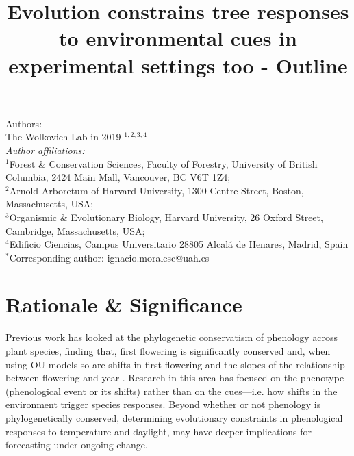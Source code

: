\documentclass{article}\usepackage[]{graphicx}\usepackage[]{color}
\title{Evolution constrains tree responses to environmental cues in experimental settings too - Outline}
\begin{document}
\maketitle

\noindent Authors:\\
The Wolkovich Lab in 2019 $^{1,2,3,4}$
\vspace{2ex}\\
\emph{Author affiliations:}\\
$^{1}$Forest \& Conservation Sciences, Faculty of Forestry, University of British Columbia, 2424 Main Mall, Vancouver, BC V6T 1Z4;\\
$^{2}$Arnold Arboretum of Harvard University, 1300 Centre Street, Boston, Massachusetts, USA;\\
$^{3}$Organismic \& Evolutionary Biology, Harvard University, 26 Oxford Street, Cambridge, Massachusetts, USA;\\
$^{4}$Edificio Ciencias, Campus Universitario 28805 Alcalá de Henares, Madrid, Spain\\
 

\vspace{2ex}
$^*$Corresponding author: ignacio.moralesc@uah.es\\
\renewcommand{\thetable}{\arabic{table}}
\renewcommand{\thefigure}{\arabic{figure}}
\renewcommand{\labelitemi}{$-$}

\clearpage
\section*{Rationale \& Significance}

Previous work has looked at the phylogenetic conservatism of phenology across plant species, finding that, first flowering is significantly conserved \citep{davies2013phylogenetic} and, when using OU models so are shifts in first flowering and the slopes of the relationship between flowering and year \citep{rafferty2017global}. Research in this area has focused on the phenotype (phenological event or its shifts) rather than on the cues---i.e. how shifts in the environment trigger species responses. Beyond whether or not phenology is phylogenetically conserved, determining evolutionary constraints in phenological responses to temperature and daylight, may have deeper implications for forecasting under ongoing change.\\ 
\end{document}
